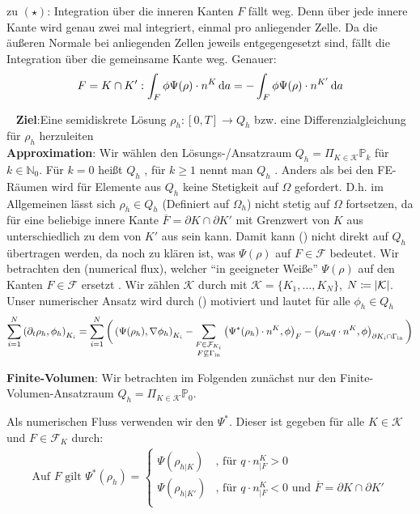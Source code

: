 \begin{remark}
	zu $ (\star) $: Integration über die inneren Kanten $ F $ fällt weg. Denn über jede innere Kante wird genau zwei mal integriert, einmal pro anliegender Zelle. Da die äußeren Normale bei anliegenden Zellen jeweils entgegengesetzt sind, fällt die Integration über die gemeinsame Kante weg. Genauer:
	\[ F = K \cap K': \int_{F}  \phi \Psi(\rho) \cdot n^K \mathop{}\!\mathrm{d} a = - \int_{F} \phi \Psi(\rho) \cdot n^{K'} \mathop{}\!\mathrm{d} a\]
\end{remark}
\ \newline
\textbf{Ziel}:Eine semidiskrete Lösung $ \rho_h: [0,T] \to Q_h $ bzw. eine Differenzialgleichung für $ \rho_h $ herzuleiten\\
\textbf{Approximation}:
Wir wählen den Lösungs-/Ansatzraum $ Q_h = \Pi_{K\in\mathcal{K}} \mathbb{P}_k $ für $ k \in \mathbb{N}_0 $. Für $ k = 0 $ heißt $ Q_h $ , für $ k \geq 1 $ nennt man $ Q_h $ . Anders als bei den FE-Räumen wird für Elemente aus $ Q_h $ keine Stetigkeit auf $ \Omega $ gefordert. D.h. im Allgemeinen lässt sich $ \rho_h \in Q_h $ (Definiert auf $ \Omega_h $) nicht stetig auf $ \Omega $ fortsetzen, da für eine beliebige innere Kante $ \overline{F} = \partial K \cap \partial K' $ mit Grenzwert von $ K $ aus unterschiedlich zu dem von $ K' $ aus sein kann. Damit kann (\sun) nicht direkt auf $ Q_h $ übertragen werden, da noch zu klären ist, was $ \Psi(\rho) $ auf $ F \in \mathcal{F} $ bedeutet. Wir betrachten den  (numerical flux), welcher \enquote{in geeigneter Weiße} $ \Psi(\rho) $ auf den Kanten $ F \in \mathcal{F} $ ersetzt . Wir zählen $ \mathcal{K} $ durch mit $ \mathcal{K} = \{K_1 , \dots , K_N\} $, $ N \coloneqq \abs{\mathcal{K}} $.
Unser numerischer Ansatz wird durch (\sun) motiviert und lautet für alle $ \phi_h \in Q_h $
\[
\sum_{i = 1}^{N} \left(\partial_t \rho_h, \phi_h  \right)_{K_i}  = \sum_{i=1}^{N} \bigg( \left(\Psi(\rho_h), \nabla\phi_h \right)_{K_i} -\sum_{\substack{F \in \mathcal{F}_{K_i} \\ F \not\subseteq \Gamma_{{\text{in}}}}} \left(\Psi^*(\rho_h) \cdot n^K, \phi \right)_{F} - \left(\rho_{\text{in}} q \cdot n^K, \phi \right)_{\partial K_i \cap \Gamma_{{\text{in}}}} \bigg)
\]



\textbf{Finite-Volumen}:
Wir betrachten im Folgenden zunächst nur den Finite-Volumen-Ansatzraum $ Q_h = \Pi_{K \in \mathcal{K}} \mathbb{P}_0 $. 

Als numerischen Fluss verwenden wir den  $ \Psi^* $. Dieser ist gegeben für alle $ K \in \mathcal{K} $ und $ F \in \mathcal{F}_K $ durch:
\begin{gather*}
	\text{Auf } F \text{ gilt }\Psi^*(\rho_h) = \begin{cases}
	\Psi(\rho_{h|K}) &\text{, für } q \cdot n^K_{|F} > 0\\
	\Psi(\rho_{h|K'}) &\text{, für } q\cdot n^K_{|F} < 0 \text{ und } \overline{F} = \partial K \cap \partial K'\\
	\end{cases}  
\end{gather*}


